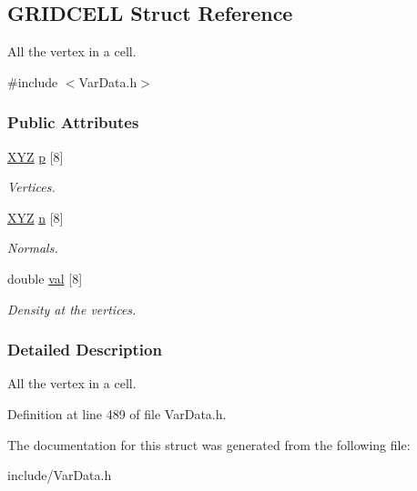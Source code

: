\hypertarget{structGRIDCELL}{}\subsection{G\+R\+I\+D\+C\+E\+LL Struct Reference}
\label{structGRIDCELL}


All the vertex in a cell.  




{\ttfamily \#include $<$Var\+Data.\+h$>$}

\subsubsection*{Public Attributes}
\begin{DoxyCompactItemize}
\item 
\hyperlink{structXYZ}{X\+YZ} \hyperlink{structGRIDCELL_af46bddc16e32b74aeff274ceaf5562f8}{p} \mbox{[}8\mbox{]}\hypertarget{structGRIDCELL_af46bddc16e32b74aeff274ceaf5562f8}{}\label{structGRIDCELL_af46bddc16e32b74aeff274ceaf5562f8}

\begin{DoxyCompactList}\small\item\em Vertices. \end{DoxyCompactList}\item 
\hyperlink{structXYZ}{X\+YZ} \hyperlink{structGRIDCELL_a50b3da89748a7768f305af0e5a186332}{n} \mbox{[}8\mbox{]}\hypertarget{structGRIDCELL_a50b3da89748a7768f305af0e5a186332}{}\label{structGRIDCELL_a50b3da89748a7768f305af0e5a186332}

\begin{DoxyCompactList}\small\item\em Normals. \end{DoxyCompactList}\item 
double \hyperlink{structGRIDCELL_a98dc06e4ef0443c670c22157e89ee97d}{val} \mbox{[}8\mbox{]}\hypertarget{structGRIDCELL_a98dc06e4ef0443c670c22157e89ee97d}{}\label{structGRIDCELL_a98dc06e4ef0443c670c22157e89ee97d}

\begin{DoxyCompactList}\small\item\em Density at the vertices. \end{DoxyCompactList}\end{DoxyCompactItemize}


\subsubsection{Detailed Description}
All the vertex in a cell. 

Definition at line 489 of file Var\+Data.\+h.



The documentation for this struct was generated from the following file\+:\begin{DoxyCompactItemize}
\item 
include/Var\+Data.\+h\end{DoxyCompactItemize}
